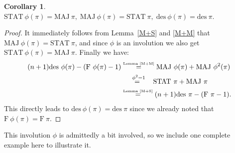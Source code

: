 \documentclass[12pt]{amsart}
\numberwithin{equation}{section}
\theoremstyle{plain}
\newtheorem{corollary}[theorem]{Corollary}
\theoremstyle{definition}
\def\MAJ{\mathrm{MAJ}}
\def\STAT{\mathrm{STAT}}
\def\F{\mathrm{F}}
\def\des{\mathrm{des}}
\begin{document}
\begin{corollary}
$\STAT~\phi(\pi)=\MAJ~\pi,\;
\MAJ~\phi(\pi)=\STAT~\pi, \;\des~\phi(\pi)=\des~\pi.$
\end{corollary}
\begin{proof}
It immediately follows from Lemma~\ref{M+S} and \ref{M+M} that $\MAJ~\phi(\pi)=\STAT~\pi$, and since $\phi$ is an involution we also get $\STAT~\phi(\pi)=\MAJ~\pi$. Finally we have:
\begin{align*}
(n+1)\des~\phi(\pi)-(\F~\phi(\pi)-1) &\stackrel{\text{\tiny Lemma~\ref{M+M}}}{=} \MAJ~\phi(\pi)+\MAJ~\phi^2(\pi)\\
&\stackrel{\phantom{aaa}\phi^2=1\phantom{aa}}{=} \STAT~\pi+\MAJ~\pi\\
&\stackrel{\text{\tiny Lemma~\ref{M+S}}}{=} (n+1)\des~\pi-(\F~\pi-1).
\end{align*}
This directly leads to $\des~\phi(\pi)=\des~\pi$ since we already noted that $\F~\phi(\pi)=\F~\pi$.
\end{proof}
This involution $\phi$ is admittedly a bit involved, so we include one complete example here to illustrate it.
\end{document}
